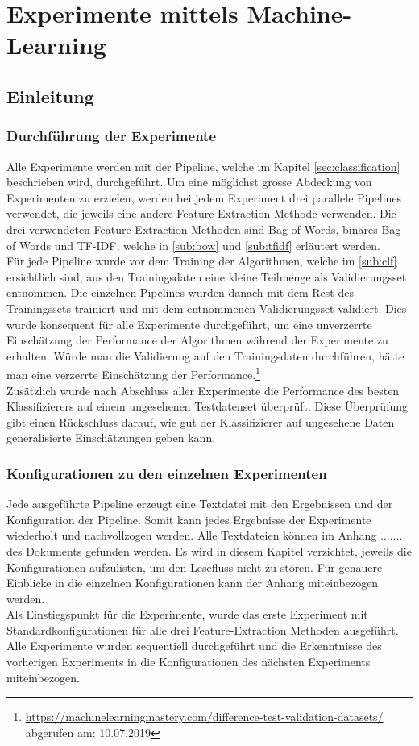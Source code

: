 \section{Experimente mittels Machine-Learning}
\subsection{Einleitung}
\subsubsection{Durchführung der Experimente}
Alle Experimente werden mit der Pipeline, welche im Kapitel \cref{sec:classification} beschrieben wird, durchgeführt.
Um eine möglichst grosse Abdeckung von Experimenten zu erzielen, werden bei jedem Experiment drei parallele Pipelines verwendet, die jeweils eine andere Feature-Extraction Methode verwenden.
Die drei verwendeten Feature-Extraction Methoden sind \glqq Bag of Words\grqq{}, \glqq binäres Bag of Words\grqq{} und \glqq TF-IDF\grqq{}, welche in \cref{sub:bow} und \cref{sub:tfidf} erläutert werden.\\
Für jede Pipeline wurde vor dem Training der Algorithmen, welche im \cref{sub:clf} ersichtlich sind, aus den Trainingsdaten eine kleine Teilmenge als Validierungsset entnommen.
Die einzelnen Pipelines wurden danach mit dem Rest des Trainingssets trainiert und mit dem entnommenen Validierungsset validiert.
Dies wurde konsequent für alle Experimente durchgeführt, um eine unverzerrte Einschätzung der Performance der Algorithmen während der Experimente zu erhalten.
Würde man die Validierung auf den Trainingsdaten durchführen, hätte man eine verzerrte Einschätzung der Performance.\footnote{\url{https://machinelearningmastery.com/difference-test-validation-datasets/} abgerufen am: 10.07.2019}\\
Zusätzlich wurde nach Abschluss aller Experimente die Performance des besten Klassifizierers auf einem ungesehenen Testdatenset überprüft.
Diese Überprüfung gibt einen Rückschluss darauf, wie gut der Klassifizierer auf ungesehene Daten generalisierte Einschätzungen geben kann.
\subsubsection{Konfigurationen zu den einzelnen Experimenten}
Jede ausgeführte Pipeline erzeugt eine Textdatei mit den Ergebnissen und der Konfiguration der Pipeline.
Somit kann jedes Ergebnisse der Experimente wiederholt und nachvollzogen werden.
Alle Textdateien können im Anhang ....... des Dokuments gefunden werden.
Es wird in diesem Kapitel verzichtet, jeweils die Konfigurationen aufzulisten, um den Lesefluss nicht zu stören.
Für genauere Einblicke in die einzelnen Konfigurationen kann der Anhang miteinbezogen werden.\\
Als Einstiegspunkt für die Experimente, wurde das erste Experiment mit Standardkonfigurationen für alle drei Feature-Extraction Methoden ausgeführt.\\
Alle Experimente wurden sequentiell durchgeführt und die Erkenntnisse des vorherigen Experiments in die Konfigurationen des nächsten Experiments miteinbezogen.
